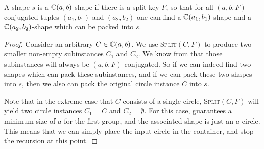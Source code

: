 \documentclass[a4paper,style=print,oneside,bibliography=totoc,nexus,lnum,extramargin]{tubsbook}
\begin{document}
\begin{theorem}\label{th:split-packing}


    A shape $s$ is a $\mathbb{C}(a,b)$-shape if there is a split key $F$, so that for all $(a,b,F)$-conjugated tuples $(a_1, b_1)$ and $(a_2, b_2)$ one can find a $\mathbb{C}(a_1, b_1)$-shape and a $\mathbb{C}(a_2, b_2)$-shape which can be packed into $s$.

\end{theorem}

\begin{proof}
    Consider an arbitrary $C \in \mathbb{C}(a,b)$.
    We use \textsc{Split}$(C,F)$ to produce two smaller non-empty subinstances $C_1$ and $C_2$. We know from  that those subinstances will always be $(a,b,F)$-conjugated. So if we can indeed find two shapes which can pack these subinstances, and if we can pack these two shapes into $s$, then we also can pack the original circle instance $C$ into $s$.

    Note that in the extreme case that $C$ consists of a single circle, \textsc{Split}$(C,F)$ will yield two circle instances $C_1 = C$ and $C_2 = \emptyset$. For this case,  guarantees a minimum size of $a$ for the first group, and the associated shape is just an $a$-circle. This means that we can simply place the input circle in the container, and stop the recursion at this point.
\end{proof}

\end{document}
